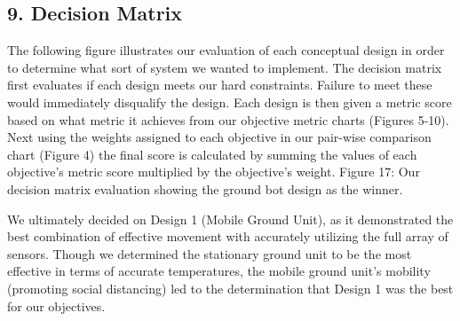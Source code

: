 ﻿\documentclass[10pt]{article}
\begin{document}
\subsection{9. Decision Matrix}
The following figure illustrates our evaluation of each conceptual design in order to determine what sort of system we wanted to implement. The decision matrix first evaluates if each design meets our hard constraints. Failure to meet these would immediately disqualify the design. Each design is then given a metric score based on what metric it achieves from our objective metric charts (Figures 5-10). Next using the weights assigned to each objective in our pair-wise comparison chart (Figure 4) the final score is calculated by summing the values of each objective's metric score multiplied by the objective’s weight. 
%
%	
%
%	
%
%	
%
%	
Figure 17: Our decision matrix evaluation showing the ground bot design as the winner.

We ultimately decided on Design 1 (Mobile Ground Unit), as it demonstrated the best combination of effective movement with accurately utilizing the full array of sensors. Though we determined the stationary ground unit to be the most effective in terms of accurate temperatures, the mobile ground unit’s mobility (promoting social distancing) led to the determination that Design 1 was the best for our objectives.
\end{document}
